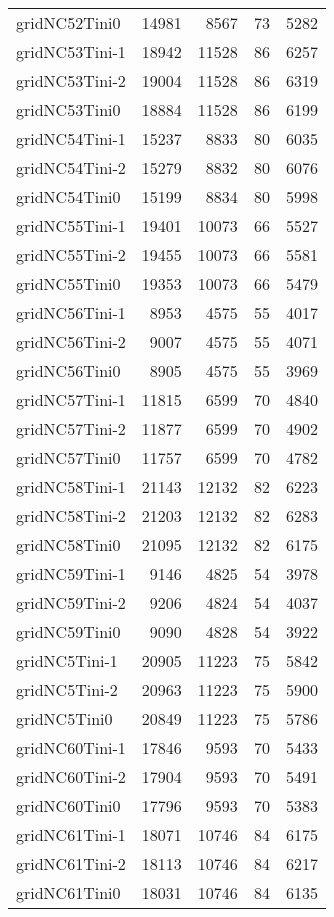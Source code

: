 \documentclass[../../../thesis.tex]{subfiles}
\begin{document}
\begin{longtable}{lrrrr}
gridNC52Tini0 & 14981 & 8567 & 73 & 5282 \\
gridNC53Tini-1 & 18942 & 11528 & 86 & 6257 \\
gridNC53Tini-2 & 19004 & 11528 & 86 & 6319 \\
gridNC53Tini0 & 18884 & 11528 & 86 & 6199 \\
gridNC54Tini-1 & 15237 & 8833 & 80 & 6035 \\
gridNC54Tini-2 & 15279 & 8832 & 80 & 6076 \\
gridNC54Tini0 & 15199 & 8834 & 80 & 5998 \\
gridNC55Tini-1 & 19401 & 10073 & 66 & 5527 \\
gridNC55Tini-2 & 19455 & 10073 & 66 & 5581 \\
gridNC55Tini0 & 19353 & 10073 & 66 & 5479 \\
gridNC56Tini-1 & 8953 & 4575 & 55 & 4017 \\
gridNC56Tini-2 & 9007 & 4575 & 55 & 4071 \\
gridNC56Tini0 & 8905 & 4575 & 55 & 3969 \\
gridNC57Tini-1 & 11815 & 6599 & 70 & 4840 \\
gridNC57Tini-2 & 11877 & 6599 & 70 & 4902 \\
gridNC57Tini0 & 11757 & 6599 & 70 & 4782 \\
gridNC58Tini-1 & 21143 & 12132 & 82 & 6223 \\
gridNC58Tini-2 & 21203 & 12132 & 82 & 6283 \\
gridNC58Tini0 & 21095 & 12132 & 82 & 6175 \\
gridNC59Tini-1 & 9146 & 4825 & 54 & 3978 \\
gridNC59Tini-2 & 9206 & 4824 & 54 & 4037 \\
gridNC59Tini0 & 9090 & 4828 & 54 & 3922 \\
gridNC5Tini-1 & 20905 & 11223 & 75 & 5842 \\
gridNC5Tini-2 & 20963 & 11223 & 75 & 5900 \\
gridNC5Tini0 & 20849 & 11223 & 75 & 5786 \\
gridNC60Tini-1 & 17846 & 9593 & 70 & 5433 \\
gridNC60Tini-2 & 17904 & 9593 & 70 & 5491 \\
gridNC60Tini0 & 17796 & 9593 & 70 & 5383 \\
gridNC61Tini-1 & 18071 & 10746 & 84 & 6175 \\
gridNC61Tini-2 & 18113 & 10746 & 84 & 6217 \\
gridNC61Tini0 & 18031 & 10746 & 84 & 6135 \\

\end{longtable}
\end{document}
